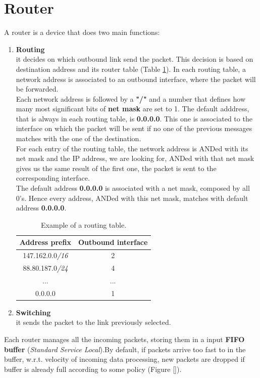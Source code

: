 \section{Router} \label{router_section}
A router is a device that does two main functions:
\begin{enumerate}
\item{\textbf{Routing}\\
it decides on which outbound link send the packet. This decision is based on destination address and its router table (Table \ref{routing_table}). In each routing table, a network address is associated to an outbound interface, where the packet will be forwarded.\\
Each network address is followed by a \textbf{"/"} and a number that defines how many most significant bits of \textbf{net mask} are set to 1. The default adddress, that is always in each routing table, is \textbf{0.0.0.0}. This one is associated to the interface on which the packet will be sent if no one of the previous messages matches with the one of the destination.\\
For each entry of the routing table, the network address is ANDed with its net mask and the IP address, we are looking for, ANDed with that net mask gives us the same result of the first one, the packet is sent to the corresponding interface.\\
The default address \textbf{0.0.0.0} is associated with a net mask, composed by all 0's. Hence every address, ANDed with this net mask, matches with default address \textbf{0.0.0.0}.
\begin{table}[h]
\centering \footnotesize
\begin{tabular}{|c|c|}
\hline
\textbf{Address prefix} & \textbf{Outbound interface}\\
\hline
{147.162.0.0\textit{/16}} & {2}\\
{88.80.187.0\textit{/24}} & {4}\\
{...} & {...}\\
{0.0.0.0} & {1}\\
\hline
\end{tabular}
\caption{Example of a routing table.}\label{routing_table}
\end{table}
}
\item{\textbf{Switching}\\
it sends the packet to the link previously selected.}
\end{enumerate}
Each router manages all the incoming packets, storing them in a input \textbf{FIFO buffer} (\textit{Standard Service Local}).By default, if packets arrive too fast to in the buffer, w.r.t. velocity of incoming data processing, new packets are dropped if buffer is already full according to some policy (Figure \ref{}).\\

